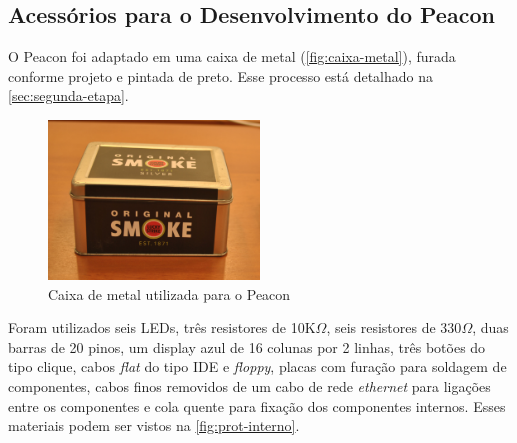 \subsection{Acessórios para o Desenvolvimento do Peacon}\label{sec:acess-prototipo}

O Peacon foi adaptado em uma caixa de metal (\autoref{fig:caixa-metal}), furada conforme projeto e pintada de preto. Esse processo está detalhado na \autoref{sec:segunda-etapa}. 

\begin{figure}[htb]
	\caption{\label{fig:caixa-metal}Caixa de metal utilizada para o Peacon}
	\begin{center}
		\includegraphics[width=0.5\textwidth]{img/caixa-metal.jpg}
	\end{center}
\end{figure}

Foram utilizados seis LEDs, três resistores de 10K$\Omega$, seis resistores de 330$\Omega$, duas barras de 20 pinos, um display azul de 16 colunas por 2 linhas, três botões do tipo clique, cabos \textit{flat} do tipo IDE e \textit{floppy}, placas com furação para soldagem de componentes, cabos finos removidos de um cabo de rede \textit{ethernet} para ligações entre os componentes e cola quente para fixação dos componentes internos. Esses materiais podem ser vistos na \autoref{fig:prot-interno}.

